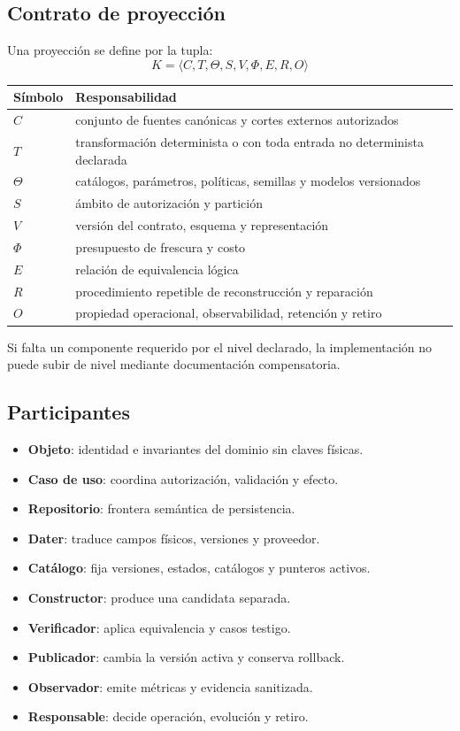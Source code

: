 \documentclass[11pt,letterpaper]{article}
\newcommand{\term}[1]{\textbf{\textcolor{bosque}{#1}}}
\begin{document}
\subsection{Contrato de proyección}
Una proyección se define por la tupla:
\[K = \langle C, T, \Theta, S, V, \Phi, E, R, O \rangle\]
\begin{longtable}{p{.1\linewidth}p{.82\linewidth}}
\toprule Símbolo & Responsabilidad \\ \midrule
$C$ & conjunto de fuentes canónicas y cortes externos autorizados \\
$T$ & transformación determinista o con toda entrada no determinista declarada \\
$\Theta$ & catálogos, parámetros, políticas, semillas y modelos versionados \\
$S$ & ámbito de autorización y partición \\
$V$ & versión del contrato, esquema y representación \\
$\Phi$ & presupuesto de frescura y costo \\
$E$ & relación de equivalencia lógica \\
$R$ & procedimiento repetible de reconstrucción y reparación \\
$O$ & propiedad operacional, observabilidad, retención y retiro \\ \bottomrule
\end{longtable}
Si falta un componente requerido por el nivel declarado, la implementación no puede
subir de nivel mediante documentación compensatoria.

\subsection{Participantes}
\begin{itemize}
\item \term{Objeto}: identidad e invariantes del dominio sin claves físicas.
\item \term{Caso de uso}: coordina autorización, validación y efecto.
\item \term{Repositorio}: frontera semántica de persistencia.
\item \term{Dater}: traduce campos físicos, versiones y proveedor.
\item \term{Catálogo}: fija versiones, estados, catálogos y punteros activos.
\item \term{Constructor}: produce una candidata separada.
\item \term{Verificador}: aplica equivalencia y casos testigo.
\item \term{Publicador}: cambia la versión activa y conserva rollback.
\item \term{Observador}: emite métricas y evidencia sanitizada.
\item \term{Responsable}: decide operación, evolución y retiro.
\end{itemize}
\end{document}
